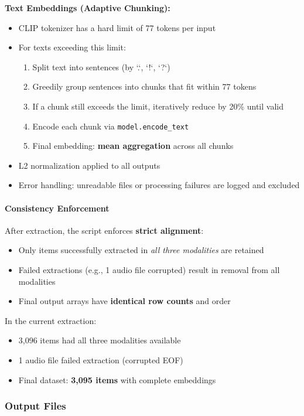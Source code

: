 \textbf{Text Embeddings (Adaptive Chunking):}
\begin{itemize}
    \item CLIP tokenizer has a hard limit of 77 tokens per input
    \item For texts exceeding this limit:
    \begin{enumerate}
        \item Split text into sentences (by `.`, `!`, `?`)
        \item Greedily group sentences into chunks that fit within 77 tokens
        \item If a chunk still exceeds the limit, iteratively reduce by 20\% until valid
        \item Encode each chunk via \texttt{model.encode\_text}
        \item Final embedding: \textbf{mean aggregation} across all chunks
    \end{enumerate}
    \item L2 normalization applied to all outputs
    \item Error handling: unreadable files or processing failures are logged and excluded
\end{itemize}

\paragraph{Consistency Enforcement}
After extraction, the script enforces \textbf{strict alignment}:
\begin{itemize}
    \item Only items successfully extracted in \textit{all three modalities} are retained
    \item Failed extractions (e.g., 1 audio file corrupted) result in removal from all modalities
    \item Final output arrays have \textbf{identical row counts} and order
\end{itemize}

In the current extraction:
\begin{itemize}
    \item 3,096 items had all three modalities available
    \item 1 audio file failed extraction (corrupted EOF)
    \item Final dataset: \textbf{3,095 items} with complete embeddings
\end{itemize}

\subsubsection{Output Files}

